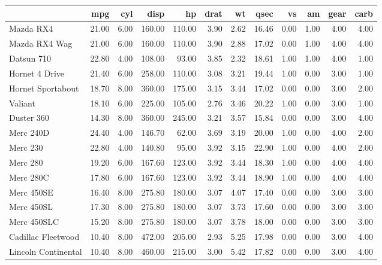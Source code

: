 \documentclass{article}\usepackage[]{graphicx}\usepackage[]{color}
\begin{document}
\begin{table}[ht]
\centering
\begin{tabular}{|l|r|r|r|r|r|r|r|r|r|r|r|}
  \hline
 & mpg & cyl & disp & hp & drat & wt & qsec & vs & am & gear & carb \\ 
  \hline
Mazda RX4 & 21.00 & 6.00 & 160.00 & 110.00 & 3.90 & 2.62 & 16.46 & 0.00 & 1.00 & 4.00 & 4.00 \\ 
  Mazda RX4 Wag & 21.00 & 6.00 & 160.00 & 110.00 & 3.90 & 2.88 & 17.02 & 0.00 & 1.00 & 4.00 & 4.00 \\ 
  Datsun 710 & 22.80 & 4.00 & 108.00 & 93.00 & 3.85 & 2.32 & 18.61 & 1.00 & 1.00 & 4.00 & 1.00 \\ 
  Hornet 4 Drive & 21.40 & 6.00 & 258.00 & 110.00 & 3.08 & 3.21 & 19.44 & 1.00 & 0.00 & 3.00 & 1.00 \\ 
  Hornet Sportabout & 18.70 & 8.00 & 360.00 & 175.00 & 3.15 & 3.44 & 17.02 & 0.00 & 0.00 & 3.00 & 2.00 \\ 
  Valiant & 18.10 & 6.00 & 225.00 & 105.00 & 2.76 & 3.46 & 20.22 & 1.00 & 0.00 & 3.00 & 1.00 \\ 
  Duster 360 & 14.30 & 8.00 & 360.00 & 245.00 & 3.21 & 3.57 & 15.84 & 0.00 & 0.00 & 3.00 & 4.00 \\ 
  Merc 240D & 24.40 & 4.00 & 146.70 & 62.00 & 3.69 & 3.19 & 20.00 & 1.00 & 0.00 & 4.00 & 2.00 \\ 
  Merc 230 & 22.80 & 4.00 & 140.80 & 95.00 & 3.92 & 3.15 & 22.90 & 1.00 & 0.00 & 4.00 & 2.00 \\ 
  Merc 280 & 19.20 & 6.00 & 167.60 & 123.00 & 3.92 & 3.44 & 18.30 & 1.00 & 0.00 & 4.00 & 4.00 \\ 
  Merc 280C & 17.80 & 6.00 & 167.60 & 123.00 & 3.92 & 3.44 & 18.90 & 1.00 & 0.00 & 4.00 & 4.00 \\ 
  Merc 450SE & 16.40 & 8.00 & 275.80 & 180.00 & 3.07 & 4.07 & 17.40 & 0.00 & 0.00 & 3.00 & 3.00 \\ 
  Merc 450SL & 17.30 & 8.00 & 275.80 & 180.00 & 3.07 & 3.73 & 17.60 & 0.00 & 0.00 & 3.00 & 3.00 \\ 
  Merc 450SLC & 15.20 & 8.00 & 275.80 & 180.00 & 3.07 & 3.78 & 18.00 & 0.00 & 0.00 & 3.00 & 3.00 \\ 
  Cadillac Fleetwood & 10.40 & 8.00 & 472.00 & 205.00 & 2.93 & 5.25 & 17.98 & 0.00 & 0.00 & 3.00 & 4.00 \\ 
  Lincoln Continental & 10.40 & 8.00 & 460.00 & 215.00 & 3.00 & 5.42 & 17.82 & 0.00 & 0.00 & 3.00 & 4.00 \\ 

\end{tabular}
\end{table}
\end{document}
